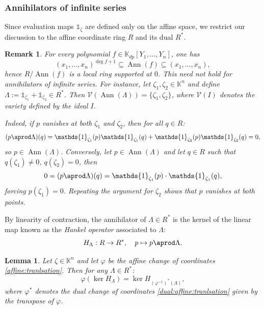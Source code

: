 \documentclass[a4paper,11p]{amsart}
\newtheorem{lemma0}[defn0]{Lemma}
\newtheorem{remark0}[defn0]{Remark}
\newenvironment{lemma}{\bigskip \begin{lemma0}}{\end{lemma0}}
\newenvironment{remark}{ \begin{remark0}\rm}{\end{remark0}}
\newcommand{\K}{\mathbb K}
\begin{document}
\subsubsection{Annihilators of infinite series}

Since evaluation maps $\mathds{1}_\zeta$ are defined only on the affine space, we restrict our discussion to the affine coordinate ring $R$ and its dual $R^*$.

\begin{remark}
    For every polynomial $f \in \K_{dp}[Y_1, \ldots, Y_n]$, one has
    \[
    (x_1, \ldots, x_n)^{\deg f + 1} \subseteq \operatorname{Ann}(f) \subseteq (x_1, \ldots, x_n),
    \]
    hence $R/\operatorname{Ann}(f)$ is a local ring supported at $0$. This need not hold for annihilators of infinite series. For instance, let $\zeta_1, \zeta_2 \in \K^n$ and define $\Lambda := \mathds{1}_{\zeta_1} + \mathds{1}_{\zeta_2} \in R^*$. Then $\mathcal{V}(\operatorname{Ann}(\Lambda)) = \{\zeta_1, \zeta_2\}$, where $\mathcal{V}(I)$ denotes the variety defined by the ideal $I$.

    Indeed, if $p$ vanishes at both $\zeta_1$ and $\zeta_2$, then for all $q \in R$:
    \[
    (p \aprod \Lambda)(q) = \mathds{1}_{\zeta_1}(p)\mathds{1}_{\zeta_1}(q) + \mathds{1}_{\zeta_2}(p)\mathds{1}_{\zeta_2}(q) = 0,
    \]
    so $p \in \operatorname{Ann}(\Lambda)$. Conversely, let $p \in \operatorname{Ann}(\Lambda)$ and let $q \in R$ such that $q(\zeta_1) \neq 0$, $q(\zeta_2) = 0$, then
    \[
    0 = (p \aprod \Lambda)(q) = \mathds{1}_{\zeta_1}(p) \cdot \mathds{1}_{\zeta_1}(q),
    \]
    forcing $p(\zeta_1) = 0$. Repeating the argument for $\zeta_2$ shows that $p$ vanishes at both points.
\end{remark}

By linearity of contraction, the annihilator of $\Lambda \in R^*$ is the kernel of the linear map known as the \emph{Hankel operator} associated to $\Lambda$:
\[
H_{\Lambda} : R \to R^*, \quad p \mapsto p \aprod \Lambda.
\]

\begin{lemma}\label{rmk: changeCoordinatesKernel}
    Let $\zeta \in \K^n$ and let $\varphi$ 
    be the affine change of coordinates \eqref{affine:tranlsation}. 
 Then for any $\Lambda \in R^*$:
    \[
    \varphi(\ker H_\Lambda) = \ker H_{(\varphi^{-1})^*(\Lambda)},
    \]
    where $\varphi^*$ denotes the dual change of coordinates \eqref{dual:affine:tranlsation} given by the transpose of $\varphi$.
\end{lemma}
\end{document}
